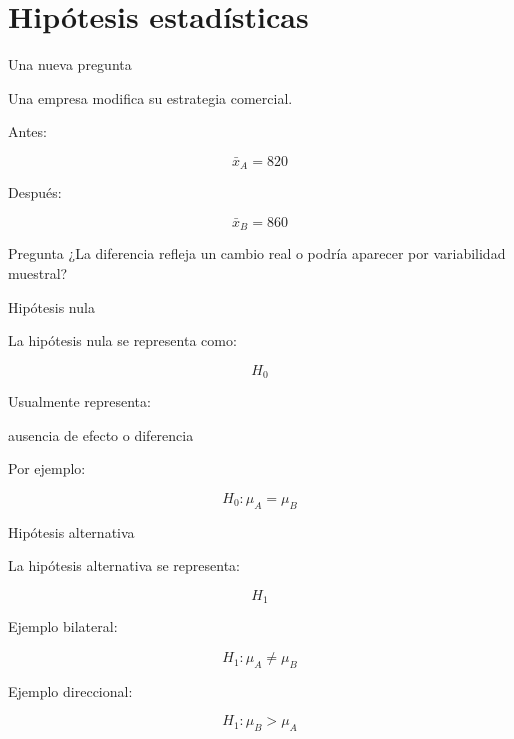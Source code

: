 \documentclass[aspectratio=169,11pt]{beamer}
\begin{document}
\section{Hipótesis estadísticas}

\begin{frame}{Una nueva pregunta}

Una empresa modifica su estrategia comercial.

Antes:

\[
\bar{x}_A
=
820
\]

Después:

\[
\bar{x}_B
=
860
\]

\vspace{0.4cm}

\begin{alertblock}{Pregunta}
¿La diferencia refleja un cambio real o podría aparecer por variabilidad muestral?
\end{alertblock}

\end{frame}


\begin{frame}{Hipótesis nula}

La hipótesis nula se representa como:

\[
H_0
\]

Usualmente representa:

\begin{center}

\Large
ausencia de efecto o diferencia

\end{center}

Por ejemplo:

\[
H_0:
\mu_A
=
\mu_B
\]

\end{frame}


\begin{frame}{Hipótesis alternativa}

La hipótesis alternativa se representa:

\[
H_1
\]

Ejemplo bilateral:

\[
H_1:
\mu_A
\neq
\mu_B
\]

Ejemplo direccional:

\[
H_1:
\mu_B
>
\mu_A
\]

\end{frame}
\end{document}
